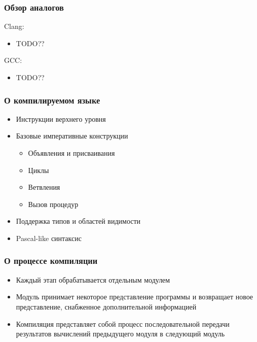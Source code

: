 \documentclass{beamer}
\begin{document}
	\begin{frame}
		\frametitle{Обзор аналогов}
		Clang:
		\begin{itemize}
			\item TODO??
		\end{itemize}
		GCC:
		\begin{itemize}
			\item TODO??
		\end{itemize}
		
	\end{frame}
	
		\begin{frame}
		\frametitle{О компилируемом языке}
		\begin{itemize}
			\item Инструкции верхнего уровня
			\item Базовые императивные конструкции
			\begin{itemize}
				\item Объявления и присваивания
				\item Циклы
				\item Ветвления
				\item Вызов процедур
			\end{itemize}
			\item Поддержка типов и областей видимости
			\item Pascal-like синтаксис
		\end{itemize}
	\end{frame}
	
	\begin{frame}
		\frametitle{О процессе компиляции}
		
			\begin{itemize}
			\item Каждый этап обрабатывается отдельным модулем
			\item Модуль принимает некоторое представление программы и возвращает новое представление, снабженное дополнительной информацией
			\item Компиляция представляет собой процесс последовательной передачи результатов вычислений предыдущего модуля в следующий модуль
			\end{itemize}

	\end{frame}
	
\end{document}
